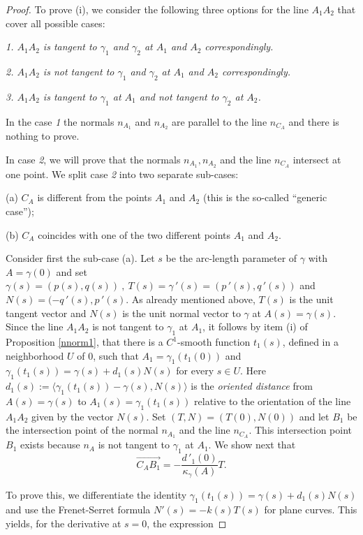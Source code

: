 \documentclass[10pt,a4paper]{amsart}
\def\g{\gamma}
\begin{document}
\begin{proof}To prove (i), we consider the following three options for the line $A_1A_2$ that cover all possible cases:

\emph{1. $A_1A_2$ is tangent to $\g_1$ and  $\g_2$
at $A_1$ and  $A_2$ correspondingly.}

\emph{2. $A_1A_2$ is not tangent to $\g_1$ and
$\g_2$ at $A_1$ and $A_2$ correspondingly. }

\emph{3. $A_1A_2$ is tangent to $\g_1$ at $A_1$ and not tangent to $\g_2$ at $A_2$. }

In the case \emph{1} the normals $n_{A_1}$ and $n_{A_2}$ are parallel to
the line $n_{C_A}$ and there is nothing to prove.

In case \emph{2}, we will prove that the normals
$n_{A_1} , n_{A_2}$
and the line $n_{C_A}$ intersect at one point.
We split case \emph{2} into two separate sub-cases:

(a) $C_A$ is different from the points $A_1$ and $A_2 $ (this is the so-called ``generic case'');

(b) $C_A$ coincides with one of the two different points $A_1$ and $A_2$.

Consider first the sub-case (a).
Let $s$ be the arc-length parameter of $\g$ with $A=\g(0)$
and set $\g(s)=(p(s), q(s)) \ , \ T(s)=\g\,'(s)=(p\,'(s),q\,'(s))$ and
$N(s)= (-q\,'(s), p\,'(s)$. As already mentioned above,  $T(s)$ is the unit tangent vector
and $N(s)$ is the unit normal vector to $\g$ at $A(s)=\g(s)$. Since the line $A_1A_2$ is not tangent to $\g_1$ at $A_1$, it
follows by item (i) of Proposition \ref{nnorm1}, that there is  a
$C^1$-smooth function $t_1(s)$, defined in a neighborhood $U$ of $0$, such that $A_1= \g_1(t_1(0))$ and
$\g_1(t_1(s))= \g(s)+ d_1(s)N(s)$ for every $s \in U$.
Here
$d_1(s):= \langle \g_1(t_1(s)) - \g(s), N(s)\rangle$ is
the {\it oriented distance} from $A(s)=\g(s)$ to $A_1(s)=\g_1(t_1(s))$ relative to the orientation
of the line $A_1A_2$ given by the vector $N(s)$. Set
$(T,N)=(T(0),N(0))$ and let $B_1$ be the intersection point of the
normal $n_{A_1}$ and the line $n_{C_A}$. This intersection point $B_1$ exists because $n_A$ is not tangent to $\g_1$ at $A_1$. We show next that
\begin{equation}\label{D1}
\overrightarrow{C_AB_1} =-\frac{d\,'_1(0)}{\kappa_{\g}(A)}T .
\end{equation}

To prove this, we differentiate the identity
$\g_1(t_1(s))= \g(s)+ d_1(s)N(s)$ and use the Frenet-Serret formula $N'(s)= -k(s)T(s)$ for plane
curves. This yields,  for the derivative at $s=0$, the expression


\end{proof}
\end{document}
